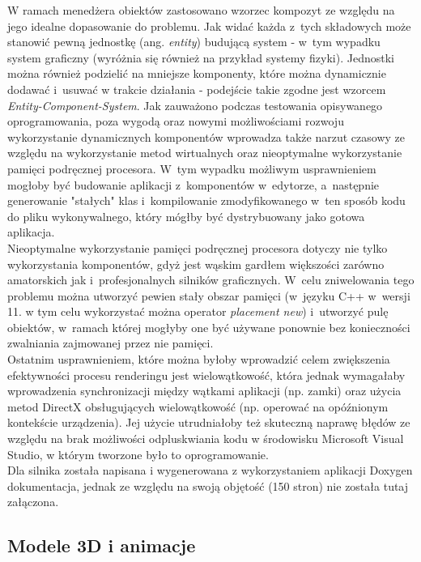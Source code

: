 W ramach menedżera obiektów zastosowano wzorzec kompozyt ze względu na jego idealne dopasowanie do problemu.
Jak widać każda z~tych składowych może stanowić pewną jednostkę (ang. \emph{entity}) budującą system - w~tym wypadku system graficzny (wyróżnia się również na przykład systemy fizyki). Jednostki można również podzielić na mniejsze komponenty, które można dynamicznie dodawać i~usuwać w trakcie działania - podejście takie zgodne jest wzorcem \emph{Entity-Component-System}. Jak zauważono podczas testowania opisywanego oprogramowania, poza wygodą oraz nowymi możliwościami rozwoju wykorzystanie dynamicznych komponentów wprowadza także narzut czasowy ze względu na wykorzystanie metod wirtualnych oraz nieoptymalne wykorzystanie pamięci podręcznej procesora. W~tym wypadku możliwym usprawnieniem mogłoby być budowanie aplikacji z~komponentów w~edytorze, a~następnie generowanie "stałych" klas i~kompilowanie zmodyfikowanego w~ten sposób kodu do pliku wykonywalnego, który mógłby być dystrybuowany jako gotowa aplikacja.\\
Nieoptymalne wykorzystanie pamięci podręcznej procesora dotyczy nie tylko wykorzystania komponentów, gdyż jest wąskim gardłem większości zarówno amatorskich jak i~profesjonalnych silników graficznych. W~celu zniwelowania tego problemu można utworzyć pewien stały obszar pamięci (w~języku C++ w~wersji 11. w tym celu wykorzystać można operator \emph{placement new}) i~utworzyć pulę obiektów, w~ramach której mogłyby one być używane ponownie bez konieczności zwalniania zajmowanej przez nie pamięci.\\
Ostatnim usprawnieniem, które można byłoby wprowadzić celem zwiększenia efektywności procesu renderingu jest wielowątkowość, która jednak wymagałaby wprowadzenia synchronizacji między wątkami aplikacji (np. zamki) oraz użycia metod DirectX obsługujących wielowątkowość (np. operować na opóźnionym kontekście urządzenia). Jej użycie utrudniałoby też skuteczną naprawę błędów ze względu na brak możliwości odpluskwiania kodu w środowisku Microsoft Visual Studio, w którym tworzone było to oprogramowanie.\\
Dla silnika została napisana i wygenerowana z wykorzystaniem aplikacji Doxygen dokumentacja, jednak ze względu na swoją objętość (150 stron) nie została tutaj załączona.

\subsection{Modele 3D i animacje}



